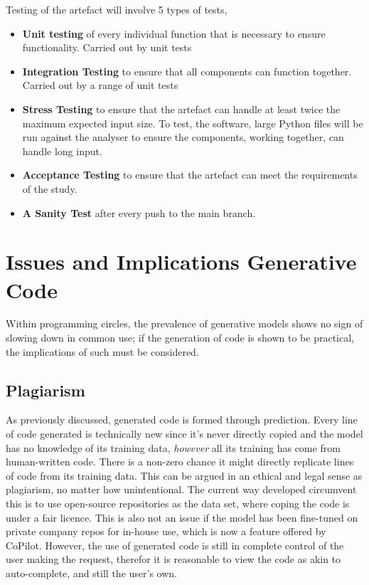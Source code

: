 \documentclass[manuscript,screen,review,sigconf]{acmart}
\begin{document}
Testing of the artefact will involve 5 types of tests,
\begin{itemize}
    \item \textbf{Unit testing} of every individual function that is necessary to ensure functionality. Carried out by unit tests
    \item \textbf{Integration Testing} to ensure that all components can function together. Carried out by a range of unit tests
    \item \textbf{Stress Testing} to ensure that the artefact can handle at least twice the maximum expected input size. To test, the software, large Python files will be run against the analyser to ensure the components, working together, can handle long input.
    \item \textbf{Acceptance Testing} to ensure that the artefact can meet the requirements of the study.
    \item \textbf{A Sanity Test} after every push to the main branch.
\end{itemize}


\section{Issues and Implications Generative Code}
Within programming circles, the prevalence of generative models shows no sign of slowing down in common use; if the generation of code is shown to be practical, the implications of such must be considered.
\subsection{Plagiarism}
As previously discussed, generated code is formed through prediction. Every line of code generated is technically new since it's never directly copied and the model has no knowledge of its training data, \textit{however} all its training has come from human-written code. There is a non-zero chance it might directly replicate lines of code from its training data. This can be argued in an ethical and legal sense as plagiarism, no matter how unintentional. The current way developed circumvent this is to use open-source repositories as the data set, where coping the code is under a fair licence. This is also not an issue if the model has been fine-tuned on private company repos for in-house use, which is now a feature offered by CoPilot. However, the use of generated code is still in complete control of the user making the request, therefor it is reasonable to view the code as akin to auto-complete, and still the user's own.
\end{document}
